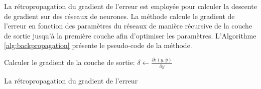 La rétropropagation du gradient de l'erreur est employée pour calculer la descente de gradient sur des réseaux de neurones. La méthode calcule le gradient de l'erreur en fonction des paramètres du réseaux de manière récursive de la couche de sortie jusqu'à la première couche afin d'optimiser les paramètres.  L'Algorithme \ref{alg:backpropagation} présente le pseudo-code de la méthode.


\begin{algorithm}[]
\small
\SetAlgoLined
{}
 Calculer le gradient de la couche de sortie: $\delta 	\leftarrow \frac{\partial \epsilon(y, \bar{y})}{\partial y}$ 
 
 \caption{La rétropropagation du gradient de l'erreur}
    \label{alg:backpropagation}
\end{algorithm}

